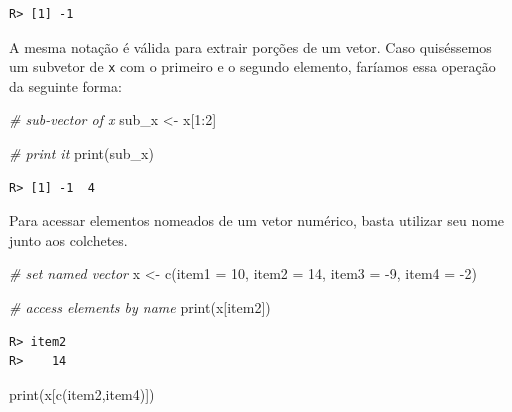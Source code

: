 \documentclass[
  11pt,
]{book}
\newenvironment{Shaded}{\begin{snugshade}}{\end{snugshade}}
\newcommand{\AttributeTok}[1]{\textcolor[rgb]{0.61,0.61,0.61}{#1}}
\newcommand{\CommentTok}[1]{\textcolor[rgb]{0.37,0.37,0.37}{\textit{#1}}}
\newcommand{\DecValTok}[1]{\textcolor[rgb]{0.06,0.06,0.06}{#1}}
\newcommand{\FunctionTok}[1]{\textcolor[rgb]{0,0,0}{#1}}
\newcommand{\NormalTok}[1]{#1}
\newcommand{\OtherTok}[1]{\textcolor[rgb]{0.37,0.37,0.37}{#1}}
\newcommand{\SpecialCharTok}[1]{\textcolor[rgb]{0,0,0}{#1}}
\newcommand{\StringTok}[1]{\textcolor[rgb]{0.5,0.5,0.5}{#1}}
\begin{document}
\begin{verbatim}
R> [1] -1
\end{verbatim}

A mesma notação é válida para extrair porções de um vetor. Caso quiséssemos um subvetor de \texttt{x} com o primeiro e o segundo elemento, faríamos essa operação da seguinte forma:

\begin{Shaded}
\begin{Highlighting}[]
\CommentTok{\# sub{-}vector of x}
\NormalTok{sub\_x }\OtherTok{\textless{}{-}}\NormalTok{ x[}\DecValTok{1}\SpecialCharTok{:}\DecValTok{2}\NormalTok{]}

\CommentTok{\# print it}
\FunctionTok{print}\NormalTok{(sub\_x)}
\end{Highlighting}
\end{Shaded}

\begin{verbatim}
R> [1] -1  4
\end{verbatim}

Para acessar elementos nomeados de um vetor numérico, basta utilizar seu nome junto aos colchetes.

\begin{Shaded}
\begin{Highlighting}[]
\CommentTok{\# set named vector}
\NormalTok{x }\OtherTok{\textless{}{-}} \FunctionTok{c}\NormalTok{(}\AttributeTok{item1 =} \DecValTok{10}\NormalTok{, }\AttributeTok{item2 =} \DecValTok{14}\NormalTok{, }\AttributeTok{item3 =} \SpecialCharTok{{-}}\DecValTok{9}\NormalTok{, }\AttributeTok{item4 =} \SpecialCharTok{{-}}\DecValTok{2}\NormalTok{)}

\CommentTok{\# access elements by name}
\FunctionTok{print}\NormalTok{(x[}\StringTok{\textquotesingle{}item2\textquotesingle{}}\NormalTok{])}
\end{Highlighting}
\end{Shaded}

\begin{verbatim}
R> item2 
R>    14
\end{verbatim}

\begin{Shaded}
\begin{Highlighting}[]
\FunctionTok{print}\NormalTok{(x[}\FunctionTok{c}\NormalTok{(}\StringTok{\textquotesingle{}item2\textquotesingle{}}\NormalTok{,}\StringTok{\textquotesingle{}item4\textquotesingle{}}\NormalTok{)])}
\end{Highlighting}
\end{Shaded}
\end{document}
